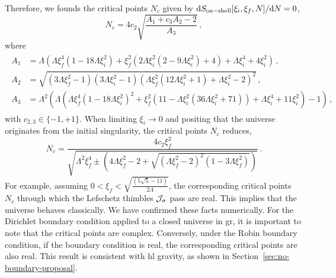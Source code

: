\documentclass[superscriptaddress,aps,preprintnumbers,nofootinbib]{revtex4-2}
\begin{document}
Therefore, we founds the critical points $N_c$ given by $\mathrm{d} S_{\rm on-shell}[\xi_{i},\xi_{f}, N]/\mathrm{d} N =0$,
\begin{equation}
N_c = 4c_{2} \sqrt{\frac{A_1 +c_{3}A_2 - 2}{A_3}}\,,
\end{equation}
where 
\begin{align}
\begin{split}
A_1 &= \Lambda  \left(\Lambda  \xi _f^4 \left(1-18 \Lambda  \xi _i^2\right)+\xi _f^2 \left(2 \Lambda  \xi _i^2 \left(2-9 \Lambda  \xi _i^2\right)+4\right)+\Lambda  \xi _i^4+4 \xi _i^2\right)\,, \\
A_2 &= \sqrt{(3 \Lambda  \xi _f^2-1)(3 \Lambda  \xi _i^2-1) \left(\Lambda  \xi _f^2 \left(12 \Lambda  \xi _i^2+1\right)+\Lambda  \xi _i^2-2\right)^2}\,, \\
A_3 &= \Lambda ^2 \left(\Lambda  \left(\Lambda  \xi _f^4 \left(1-18 \Lambda  \xi _i^2\right)^2+\xi _f^2 \left(11-\Lambda  \xi _i^2 \left(36 \Lambda  \xi _i^2+71\right)\right)+\Lambda  \xi _i^4+11 \xi _i^2\right)-1\right)\,,
\end{split}
\end{align}
with $c_{2,3} \in \{-1 , +1\}$. When limiting $\xi_i \to 0$
and positing that the universe originates from the initial singularity,
the critical points $N_c$ reduces, 
\begin{equation}
N_c = 
\frac{4c_{2} \xi _f^2}{\sqrt{\Lambda ^2 \xi _f^4\pm \left(4 \Lambda  \xi _f^2-2+\sqrt{(\Lambda\xi _f^2-2)^2(1-3 \Lambda  \xi _f^2)}\right)}}\,.
\end{equation}
For example, assuming $0<\xi _f<\sqrt{\frac{(5\sqrt{5}-11)}{2\Lambda}}$, the corresponding critical points $N_c$ through which the Lefschetz thimbles $\cal J_\sigma$ pass are real. This implies that the universe behaves classically. We have confirmed these facts numerically. For the Dirichlet boundary condition applied to a closed universe in \ac{gr}, it is important to note that the critical points are complex. Conversely, under the Robin boundary condition, if the boundary condition is real, the corresponding critical points are also real. This result is consistent with \ac{hl} gravity, as shown in Section~\ref{sec:no-boundary-proposal}.










\end{document}
